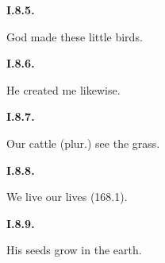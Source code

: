 \par\begin{minipage}{\linewidth}\raggedright
\textbf{I.8.5.}

God made these little birds.

\end{minipage}\par\addvspace{4pt}

\par\begin{minipage}{\linewidth}\raggedright
\textbf{I.8.6.}

He created me likewise.

\end{minipage}\par\addvspace{4pt}

\par\begin{minipage}{\linewidth}\raggedright
\textbf{I.8.7.}

Our cattle (plur.) see the grass.

\end{minipage}\par\addvspace{4pt}

\par\begin{minipage}{\linewidth}\raggedright
\textbf{I.8.8.}

We live our lives (168.1).

\end{minipage}\par\addvspace{4pt}

\par\begin{minipage}{\linewidth}\raggedright
\textbf{I.8.9.}

His seeds grow in the earth.

\end{minipage}\par\addvspace{4pt}

